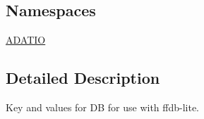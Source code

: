 \subsection*{Namespaces}
\begin{DoxyCompactItemize}
\item 
 \mbox{\hyperlink{namespaceADATIO}{A\+D\+A\+T\+IO}}
\end{DoxyCompactItemize}


\subsection{Detailed Description}
Key and values for DB for use with ffdb-\/lite. 

